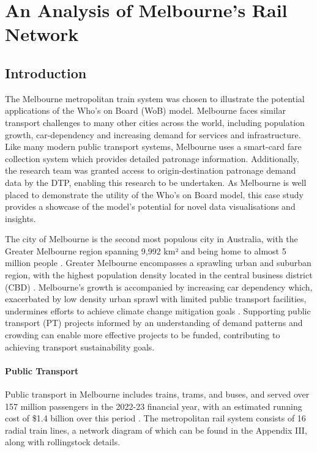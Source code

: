 \chapter{An Analysis of Melbourne's Rail Network}
\label{chap:CaseStudy}

\section{Introduction}
The Melbourne metropolitan train system was chosen to illustrate the potential applications of the Who's on Board (WoB) model. Melbourne faces similar transport challenges to many other cities across the world, including population growth, car-dependency and increasing demand for services and infrastructure. Like many modern public transport systems, Melbourne uses a smart-card fare collection system which provides detailed patronage information. Additionally, the research team was granted access to origin-destination patronage demand data by the DTP, enabling this research to be undertaken. As Melbourne is well placed to demonstrate the utility of the Who's on Board model, this case study provides a showcase of the model's potential for novel data visualisations and insights.

The city of Melbourne is the second most populous city in Australia, with the Greater Melbourne region spanning 9,992 km² and being home to almost 5 million people \cite{australianbureauofstatisticsGreaterMelbourne2021}. Greater Melbourne encompasses a sprawling urban and suburban region, with the highest population density located in the central business district (CBD) \cite{australianbureauofstatisticsRegionalPopulation2022}. Melbourne's growth is accompanied by increasing car dependency which, exacerbated by low density urban sprawl with limited public transport facilities, undermines efforts to achieve climate change mitigation goals \cite{rahnamaSpatialtemporalAnalysisUrban2020}. Supporting public transport (PT) projects informed by an understanding of demand patterns and crowding can enable more effective projects to be funded, contributing to achieving transport sustainability goals.

\subsubsection{Public Transport}
Public transport in Melbourne includes trains, trams, and buses, and served over 157 million passengers in the 2022-23 financial year, with an estimated running cost of \$1.4 billion over this period \cite[p.~47]{victoriandepartmentoftransportandplanningDepartmentTransportPlanning2023}. The metropolitan rail system consists of 16 radial train lines, a network diagram of which can be found in the Appendix III, along with rollingstock details.


